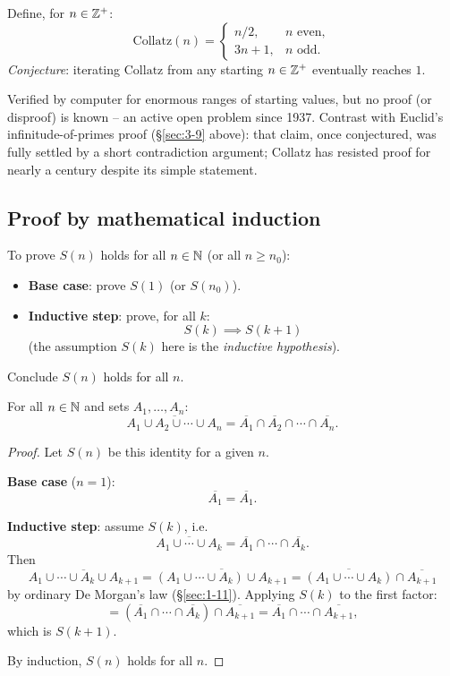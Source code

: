 \documentclass[11pt]{article}
\begin{document}
\begin{example}
Define, for $n\in\mathbb{Z}^+$:
\[
\mathrm{Collatz}(n) = \begin{cases} n/2, & n \text{ even}, \\ 3n+1, & n \text{ odd}. \end{cases}
\]
\emph{Conjecture}: iterating $\mathrm{Collatz}$ from any starting $n\in\mathbb{Z}^+$ eventually reaches $1$.
\end{example}

\begin{note}
Verified by computer for enormous ranges of starting values, but no proof (or disproof) is known -- an active open problem since 1937. Contrast with Euclid's infinitude-of-primes proof (\S\ref{sec:3-9} above): that claim, once conjectured, was fully settled by a short contradiction argument; Collatz has resisted proof for nearly a century despite its simple statement.
\end{note}

\subsection{Proof by mathematical induction}
\label{sec:3-10}

\begin{note}
To prove $S(n)$ holds for all $n \in \mathbb{N}$ (or all $n \ge n_0$):
\begin{itemize}
    \item \textbf{Base case}: prove $S(1)$ (or $S(n_0)$).
    \item \textbf{Inductive step}: prove, for all $k$:
    \[
    S(k) \implies S(k+1)
    \]
    (the assumption $S(k)$ here is the \emph{inductive hypothesis}).
\end{itemize}
Conclude $S(n)$ holds for all $n$.
\end{note}

\bigskip
\begin{theorem}
For all $n \in \mathbb{N}$ and sets $A_1,\dots,A_n$:
\[
\overline{A_1 \cup A_2 \cup \cdots \cup A_n} = \overline{A_1} \cap \overline{A_2} \cap \cdots \cap \overline{A_n}.
\]
\end{theorem}
\begin{proof}
Let $S(n)$ be this identity for a given $n$.

\textbf{Base case} ($n=1$):
\[
\overline{A_1} = \overline{A_1}.
\]

\textbf{Inductive step}: assume $S(k)$, i.e.
\[
\overline{A_1\cup\cdots\cup A_k} = \overline{A_1}\cap\cdots\cap\overline{A_k}.
\]
Then
\[
\overline{A_1\cup\cdots\cup A_k \cup A_{k+1}} = \overline{(A_1\cup\cdots\cup A_k) \cup A_{k+1}} = \overline{(A_1\cup\cdots\cup A_k)} \cap \overline{A_{k+1}}
\]
by ordinary De Morgan's law (\S\ref{sec:1-11}). Applying $S(k)$ to the first factor:
\[
= (\overline{A_1}\cap\cdots\cap\overline{A_k})\cap\overline{A_{k+1}} = \overline{A_1}\cap\cdots\cap\overline{A_{k+1}},
\]
which is $S(k+1)$.

By induction, $S(n)$ holds for all $n$.
\end{proof}
\end{document}
